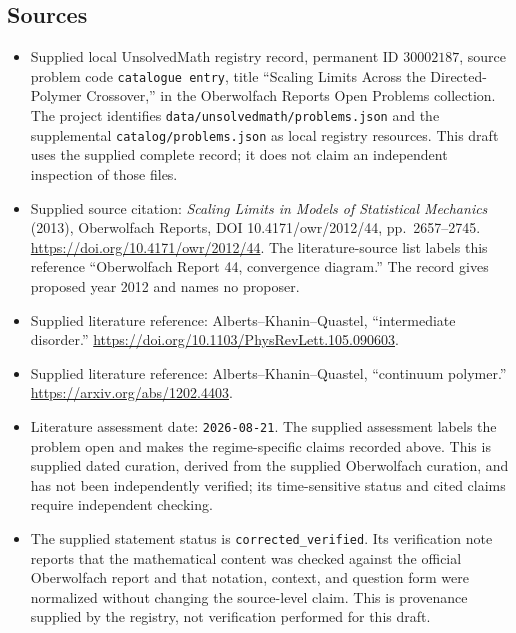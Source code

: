 \documentclass[11pt]{article}
\begin{document}
\subsection{Sources}
\begin{itemize}
\item Supplied local UnsolvedMath registry record, permanent ID \(30002187\), source problem code \texttt{catalogue entry}, title ``Scaling Limits Across the Directed-Polymer Crossover,'' in the Oberwolfach Reports Open Problems collection. The project identifies \texttt{data/unsolvedmath/problems.json} and the supplemental \texttt{catalog/problems.json} as local registry resources. This draft uses the supplied complete record; it does not claim an independent inspection of those files.
\item Supplied source citation: \emph{Scaling Limits in Models of Statistical Mechanics} (2013), Oberwolfach Reports, DOI 10.4171/owr/2012/44, pp.~2657--2745. \url{https://doi.org/10.4171/owr/2012/44}. The literature-source list labels this reference ``Oberwolfach Report 44, convergence diagram.'' The record gives proposed year 2012 and names no proposer.
\item Supplied literature reference: Alberts--Khanin--Quastel, ``intermediate disorder.'' \url{https://doi.org/10.1103/PhysRevLett.105.090603}.
\item Supplied literature reference: Alberts--Khanin--Quastel, ``continuum polymer.'' \url{https://arxiv.org/abs/1202.4403}.
\item Literature assessment date: \texttt{2026-08-21}. The supplied assessment labels the problem open and makes the regime-specific claims recorded above. This is supplied dated curation, derived from the supplied Oberwolfach curation, and has not been independently verified; its time-sensitive status and cited claims require independent checking.
\item The supplied statement status is \texttt{corrected\_verified}. Its verification note reports that the mathematical content was checked against the official Oberwolfach report and that notation, context, and question form were normalized without changing the source-level claim. This is provenance supplied by the registry, not verification performed for this draft.
\end{itemize}
\end{document}

